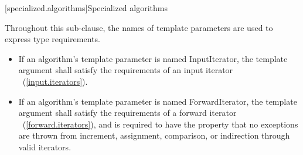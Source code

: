 \setcounter{subsection}{9}
[specialized.algorithms]{Specialized algorithms}
{\color{remclr}
\setcounter{Paras}{0}
\pnum
Throughout this sub-clause, the names of template parameters are used to express type requirements.
\begin{itemize}
\item If an algorithm's template parameter is named InputIterator, the template argument shall
satisfy the requirements of an input iterator ~(\ref{input.iterators}).

\item If an algorithm's template parameter is named ForwardIterator, the template argument shall
satisfy the requirements of a forward iterator ~(\ref{forward.iterators}), and is required to have
the property that no exceptions are thrown from increment, assignment, comparison, or indirection
through valid iterators.
\end{itemize}
} %

